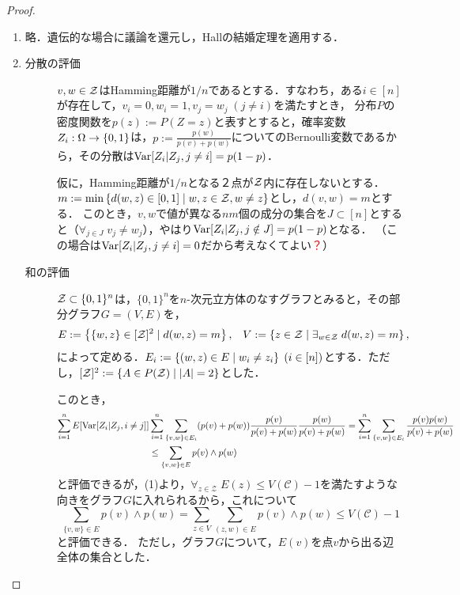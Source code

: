 \documentclass[uplatex,dvipdfmx]{jsreport}
\renewcommand{\C}{\mathcal{C}}
\renewcommand{\Z}{\mathcal{Z}}
\begin{document}
\begin{proof}\mbox{}
    \begin{enumerate}
        \item 略．遺伝的な場合に議論を還元し，Hallの結婚定理を適用する．
        \item \begin{description}
            \item[分散の評価] $v,w\in\mathcal{Z}$はHamming距離が$1/n$であるとする．すなわち，ある$i\in[n]$が存在して，$v_i=0,w_i=1,v_j=w_j\;(j\ne i)$を満たすとき，
            分布$P$の密度関数を$p(z):=P(Z=z)$と表すとすると，確率変数$Z_i:\Omega\to\{0,1\}$は，$p:=\frac{p(w)}{p(v)+p(w)}$についてのBernoulli変数であるから，その分散は$\mathrm{Var}[Z_i|Z_j,j\ne i]=p(1-p)$．

            仮に，Hamming距離が$1/n$となる２点が$\mathcal{Z}$内に存在しないとする．$m:=\min\left\{d(w,z)\in[0,1]\mid w,z\in\mathcal{Z},w\ne z\right\}$とし，$d(v,w)=m$とする．
            このとき，$v,w$で値が異なる$nm$個の成分の集合を$J\subset[n]$とすると（$\forall_{j\in J}\;v_j\ne w_j$），やはり$\mathrm{Var}[Z_i|Z_j,j\notin J]=p(1-p)$となる．
            （この場合は$\mathrm{Var}[Z_i|Z_j,j\ne i]=0$だから考えなくてよい\textcolor{red}{？}）
            \item[和の評価]
            $\mathcal{Z}\subset\{0,1\}^n$は，$\{0,1\}^n$を$n$-次元立方体のなすグラフとみると，その部分グラフ$G=(V,E)$を，
            \begin{align*}
                E&:=\Brace{\{w,z\}\in[\cZ]^2\mid d(w,z)=m},&V&:=\Brace{z\in\Z\mid\exists_{w\in\Z}\;d(w,z)=m},
            \end{align*}
            によって定める．$E_i:=\left\{(w,z)\in E\mid w_i\ne z_i\right\}\;(i\in[n])$とする．ただし，$[\Z]^2:=\{A\in P(\Z)\mid\abs{A}=2\}$とした．

            このとき，
            \begin{align*}
                \sum^n_{i=1}E[\mathrm{Var}[Z_i|Z_j,i\ne j]]&\sum^n_{i=1}\sum_{\{v,w\}\in E_i}(p(v)+p(w))\frac{p(v)}{p(v)+p(w)}\frac{p(w)}{p(v)+p(w)}=\sum^n_{i=1}\sum_{\{v,w\}\in E_i}\frac{p(v)p(w)}{p(v)+p(w)}\\
                &\le\sum_{\{v,w\}\in E}p(v)\land p(w)
            \end{align*}
            と評価できるが，(1)より，$\forall_{z\in\Z}\;E(z)\le V(\C)-1$を満たすような向きをグラフ$G$に入れられるから，これについて
            \[\sum_{\{v,w\}\in E}p(v)\land p(w)=\sum_{z\in V}\sum_{(z,w)\in E}p(v)\land p(w)\le V(\C)-1\]
            と評価できる．
            ただし，グラフ$G$について，$E(v)$を点$v$から出る辺全体の集合とした．


\end{description}
\end{enumerate}
\end{proof}
\end{document}
